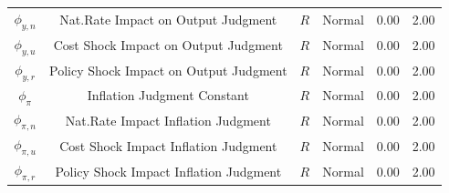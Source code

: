 \documentclass[12pt]{article}
\begin{document}
{\begin{table}
\begin{center}
\begin{tabular}{c|c|c||c|cc}
$\phi_{y,n}$ & Nat.Rate Impact on Output Judgment & ${R}$ & Normal & 0.00 & 2.00 \\ 
$\phi_{y,u}$ & Cost Shock Impact on Output Judgment & ${R}$ & Normal & 0.00 & 2.00 \\ 
$\phi_{y,r}$ & Policy Shock Impact on Output Judgment & ${R}$ & Normal & 0.00 & 2.00 \\ 
$\phi_{\pi}$ & Inflation Judgment Constant & ${R}$ & Normal & 0.00 & 2.00 \\ 
$\phi_{\pi,n}$ & Nat.Rate Impact Inflation Judgment & ${R}$ & Normal & 0.00 & 2.00 \\ 
$\phi_{\pi,u}$ & Cost Shock Impact Inflation Judgment & ${R}$ & Normal & 0.00 & 2.00 \\ 
$\phi_{\pi,r}$ & Policy Shock Impact Inflation Judgment & ${R}$ & Normal & 0.00 & 2.00 \\ \hline
\end{tabular}
\end{center}
\end{table}


}
\end{document}
